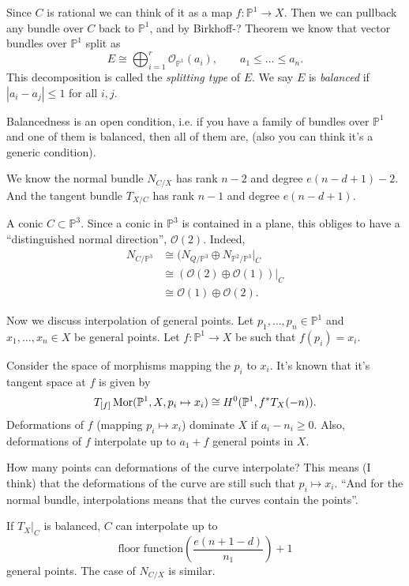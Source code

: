 {Since $C$ is rational we can think of it
as a map $f:\mathbb{P}^1 \to X$.
Then we can pullback any bundle over $C$ 
back to $\mathbb{P}^1$,
and by Birkhoff-? Theorem
we know that vector bundles over $\mathbb{P}^1$ 
split as
$$
E\cong \bigoplus_{i=1}^r \mathcal{O}_{\mathbb{P}^1}(a_i),
\qquad a_1\leq \ldots \leq a_n.
$$
This decomposition is called the
{\it splitting type} of $E$.
We say $E$ is {\it balanced} if
$|a_i-a_j|\leq 1$ for all $i,j$.

Balancedness is an open condition,
i.e. if you have a family of bundles over $\mathbb{P}^1$ 
and one of them is balanced, then all of them are,
(also you can think it's a generic condition).

We know the normal bundle $N_{C/X}$ has rank $n-2$
and degree  $e(n-d+1)-2$.
And the tangent bundle $T_{X/C}$ 
has rank $n-1$ and degree $e(n-d+1)$.

\begin{example}
\label{example-conic}
A conic $C \subset \mathbb{P}^3$.
Since a conic in $\mathbb{P}^3$ is contained in a plane,
this obliges to have a ``distinguished normal direction'',
$\mathcal{O}(2)$. Indeed,
\begin{align*}
N_{C/\mathbb{P}^3}&\cong(N_{Q/\mathbb{P}^3}\oplus
N_{\mathbb{P}^2/\mathbb{P}^3}|_{C}\\
&\cong(\mathcal{O}(2) \oplus \mathcal{O}(1))|_{C}\\
&\cong\mathcal{O}(1)\oplus \mathcal{O}(2).
\end{align*}
\end{example}

\medskip\noindent
Now we discuss interpolation of general points.
Let $p_1,\ldots,p_n \in \mathbb{P}^1$ 
and $x_1,\ldots, x_n \in X$ 
be general points.
Let $f:\mathbb{P}^1 \to X$ be such that
$f(p_i)=x_i$.

Consider the space of morphisms mapping
the  $p_i$ to $x_i$. It's known that it's tangent space
at $f$
is given by
$$
T_{[f]}\mathop{\mathrm{Mor}}\nolimits(\mathbb{P}^1,X,p_i \mapsto x_i)
\cong H^0(\mathbb{P}^1,f^*T_X(-n)).
$$
\noindent
Deformations of $f$ (mapping $p_i \mapsto x_i$)
dominate $X$ if $a_i-n_i \geq 0$.
Also, deformations of $f$ interpolate up
to $a_1+f$ general points in $X$.

\medskip\noindent
How many points can deformations of the curve interpolate?
This means (I think) that the deformations of the curve
are still such that $p_i \mapsto  x_i$.
``And for the normal bundle, interpolations
means that the curves contain the points''.

If $T_X|_{C}$ is balanced, $C$ can interpolate up to
$$
\text{floor function}(\frac{e(n+1-d)}{n_1}) +1
$$
general points. The case of $N_{C/X}$ is similar.

}
